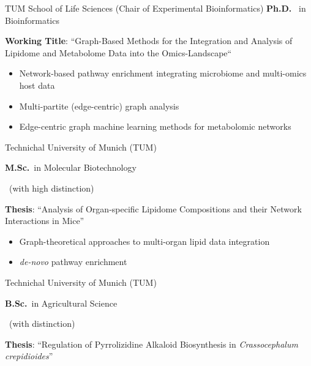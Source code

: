 {%
	TUM School of Life Sciences (Chair of Experimental Bioinformatics)%
}
{%
	\textbf{Ph.D.}~ in Bioinformatics%
}
{%
	\vspace{.1cm}
	\textbf{Working Title}: ``Graph-Based Methods for the Integration and Analysis of Lipidome and Metabolome Data into the Omics-Landscape``%
	\begin{itemize}
		\item Network-based pathway enrichment integrating microbiome and multi-omics host data
		\item Multi-partite (edge-centric) graph analysis
		\item Edge-centric graph machine learning methods for metabolomic networks
	\end{itemize}
}

{%
	Technichal University of Munich (TUM)%
}
{%
	\textbf{M.Sc.}~in Molecular Biotechnology
	\begin{footnotesize}
		~(with high distinction)
	\end{footnotesize}%
}
{%
	\vspace{.1cm}
	\textbf{Thesis}: ``Analysis of Organ-specific Lipidome Compositions and their Network Interactions in Mice''%
	\begin{itemize}
		\item Graph-theoretical approaches to multi-organ lipid data integration
		\item \textit{de-novo} pathway enrichment
	\end{itemize}
}

{%
	Technichal University of Munich (TUM)%
}
{%
	\textbf{B.Sc.}~in Agricultural Science%
	\begin{footnotesize}
		~(with distinction)
	\end{footnotesize}%
}
{%
	\vspace{.1cm}
	\textbf{Thesis}: ``Regulation of Pyrrolizidine Alkaloid Biosynthesis in \textit{Crassocephalum crepidioides}''%
}
